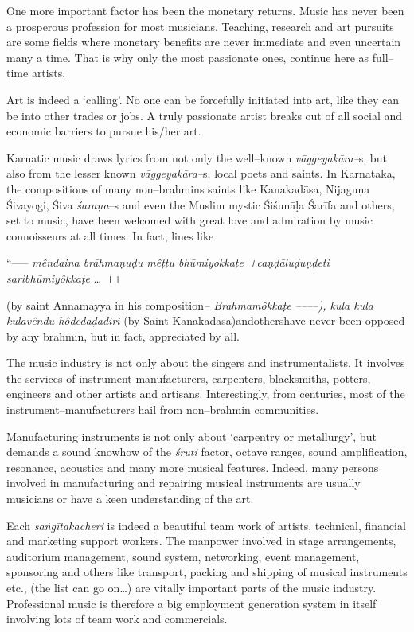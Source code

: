 One more important factor has been the monetary returns. Music has never been a prosperous profession for most musicians. Teaching, research and art pursuits are some fields where monetary benefits are never immediate and even uncertain many a time. That is why only the most passionate ones, continue here as full–time artists.

Art is indeed a ‘calling’. No one can be forcefully initiated into art, like they can be into other trades or jobs. A truly passionate artist breaks out of all social and economic barriers to pursue his/her art.

Karnatic music draws lyrics from not only the well–known \textit{vāggeyakāra–}s, but also from the lesser known \textit{vāggeyakāra–}s, local poets and saints. In Karnataka, the compositions of many non–brahmins saints like Kanakadāsa, Nijaguṇa Śivayogi, Śiva \textit{śaraṇa}–s and even the Muslim mystic Śiśunāḷa Śarīfa and others, set to music, have been welcomed with great love and admiration by music connoisseurs at all times. In fact, lines like

“––– \textit{mêndaina brāhmaṇuḍu mêṭṭu bhūmiyokkaṭe~।caṇḍāluḍuṇḍeti saribhūmiyôkkaṭe} …~।।

(by saint Annamayya in his composition\textit{– Brahmamôkkaṭe ––––), kula kula kulavêndu hôḍedāḍadiri} (by Saint Kanakadāsa)andothershave never been opposed by any brahmin, but in fact, appreciated by all.

The music industry is not only about the singers and instrumentalists. It involves the services of instrument manufacturers, carpenters, blacksmiths, potters, engineers and other artists and artisans. Interestingly, from centuries, most of the instrument–manufacturers hail from non–brahmin communities.

Manufacturing instruments is not only about ‘carpentry or metallurgy’, but demands a sound knowhow of the \textit{śruti} factor, octave ranges, sound amplification, resonance, acoustics and many more musical features. Indeed, many persons involved in manufacturing and repairing musical instruments are usually musicians or have a keen understanding of the art.

Each\textit{ saṅgīta}\textit{kacheri} is indeed a beautiful team work of artists, technical, financial and marketing support workers. The manpower involved in stage arrangements, auditorium management, sound system, networking, event management, sponsoring and others like transport, packing and shipping of musical instruments etc., (the list can go on…) are vitally important parts of the music industry. Professional music is therefore a big employment generation system in itself involving lots of team work and commercials.


